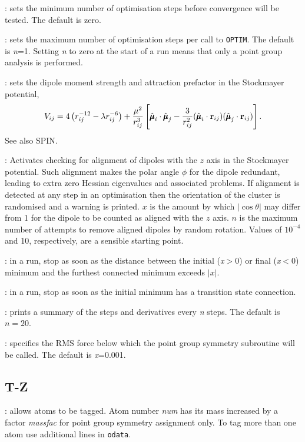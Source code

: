 {{{: sets the minimum number of optimisation steps before convergence
will be tested. The default is zero.

: sets the maximum number of optimisation steps per call
to {\tt OPTIM}. The default is {\it n\/}=1. Setting {\it n\/} to zero at the start of a run
means that only a point group analysis is performed.

: sets the dipole moment strength and attraction prefactor
in the Stockmayer potential,
\begin{displaymath}
V_{ij} = 4\left(r_{ij}^{-12}-\lambda r_{ij}^{-6}\right) + \frac{\mu^2}{r_{ij}^3}
\left[\hat{\pmb\mu}_i\cdot\hat{\pmb\mu}_j-\frac{3}{r_{ij}^2}
(\hat{\pmb\mu}_i\cdot{\bf r}_{ij})(\hat{\pmb\mu}_j\cdot{\bf r}_{ij})\right].
\end{displaymath}
See also {SPIN}.

: Activates checking for alignment of dipoles with the $z$ axis in
the Stockmayer potential.  Such alignment makes the polar angle $\phi$ for the dipole
redundant, leading to extra zero Hessian eigenvalues and associated problems.  If alignment
is detected at any step in an optimisation then the orientation of the cluster is randomised
and a warning is printed.
$x$ is the amount by which $|\cos\theta|$ may differ from 1 for the dipole to be counted as
aligned with the $z$ axis.  $n$ is the maximum number of attempts to remove aligned dipoles
by random rotation.  Values of $10^{-4}$ and 10, respectively, are a sensible starting point.

: in a  run, stop as soon as the distance between
the initial ({\it x}$>0$) or final ({\it x}$<0$) minimum and the furthest connected minimum
exceeds $|x|$.

: in a  run, stop as soon as the initial minimum has a transition state
connection.

: prints a summary of the steps and derivatives
every {\it n\/} steps. The default is $n=20$.

: specifies the RMS force below which the point
group symmetry subroutine will be called. The default is {\it x\/}=0.001.




\subsection{T-Z}
:
allows atoms to be tagged. Atom number {\it num\/} has its mass increased
by a factor {\it massfac\/} for point group symmetry assignment only.
To tag more than one atom use additional {} lines in {\tt odata}.

}}}
